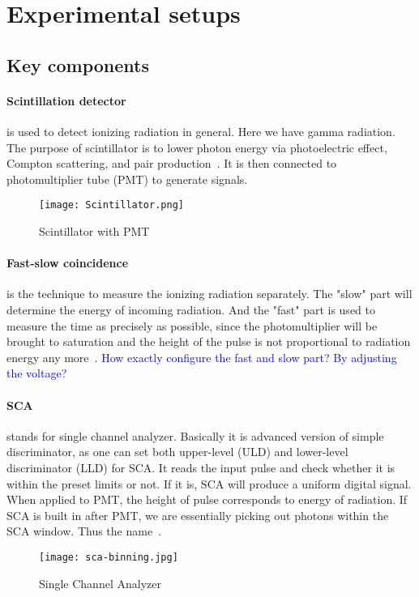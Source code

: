 \section{Experimental setups}

\subsection{Key components}
\paragraph{Scintillation detector}
is used to detect ionizing radiation in general. Here we have gamma radiation. The purpose of scintillator is to lower photon energy via photoelectric effect, Compton scattering, and pair production~\cite{wermes}. It is then connected to photomultiplier tube (PMT) to generate signals.
\begin{figure}[ht]
   \centering
   \texttt{[image: Scintillator.png]}
   \caption{Scintillator with PMT~\cite{wikiScin}}%
\end{figure}


\paragraph{Fast-slow coincidence} is the technique to measure the ionizing radiation separately. The "slow" part will determine the energy of incoming radiation. And the "fast" part is used to measure the time as precisely as possible, since the photomultiplier will be brought to saturation and the height of the pulse is not proportional to radiation energy any more~\cite{IACI1968103}. \textcolor{blue}{How exactly configure the fast and slow part? By adjusting the voltage?}

\paragraph{SCA} stands for single channel analyzer. Basically it is advanced version of simple discriminator, as one can set both upper-level (ULD) and lower-level discriminator (LLD) for SCA. It reads the input pulse and check whether it is within the preset limits or not. If it is, SCA will produce a uniform digital signal.
When applied to PMT, the height of pulse corresponds to energy of radiation. If SCA is built in after PMT, we are essentially picking out photons within the SCA window. Thus the name~\cite{SCAmanual}.

\begin{figure}[ht]
	\centering
	\texttt{[image: sca-binning.jpg]}
	\caption{Single Channel Analyzer~\cite{wikiScin}}%
\end{figure}

